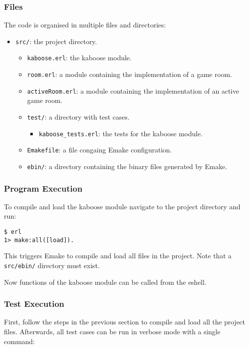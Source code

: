 \documentclass[11pt, a4paper]{article}
\begin{document}
\subsubsection{Files}
The code is organised in multiple files and directories:
\begin{itemize}
	\item \texttt{src/}: the project directory. 
	\begin{itemize}
		\item \texttt{kaboose.erl}: the kaboose module.
		\item \texttt{room.erl}: a module containing the implementation of a game room.
		\item \texttt{activeRoom.erl}: a module containing the implementation of an active game room.
		\item \texttt{test/}: a directory with test cases.
		\begin{itemize}
			\item \texttt{kaboose\_tests.erl}: the tests for the kaboose module.
		\end{itemize}
		\item \texttt{Emakefile}: a file congaing Emake configuration.
		\item \texttt{ebin/}: a directory containing the binary files generated by Emake.
	\end{itemize}
\end{itemize}

\subsubsection{Program Execution}
To compile and load the kaboose module navigate to the project directory and run:

\begin{verbatim}
$ erl
1> make:all([load]).
\end{verbatim}

This triggers Emake to compile and load all files in the project. Note that a \texttt{src/ebin/} directory must exist.

Now functions of the kaboose module can be called from the eshell.


\subsubsection{Test Execution}
First, follow the steps in the previous section to compile and load all the project files. Afterwards, all test cases can be run in verbose mode with a single command:
\end{document}
